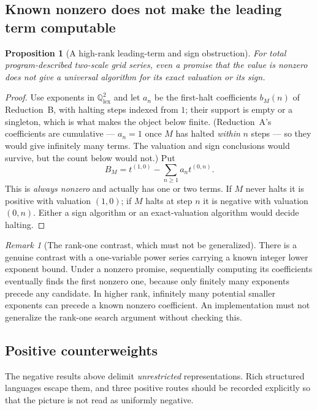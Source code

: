 \documentclass[11pt,letterpaper]{article}
\numberwithin{equation}{section}
\newtheorem{proposition}[theorem]{Proposition}
\theoremstyle{definition}
\theoremstyle{remark}
\newtheorem{remark}[theorem]{Remark}
\newcommand{\Q}{\mathbb Q}
\begin{document}
\subsection{Known nonzero does not make the leading term computable}
\label{cas:sub-highrank}
\begin{proposition}[A high-rank leading-term and sign obstruction]
\label{cas:prop-leading}
For total program-described two-scale grid series, even a promise that the value
is nonzero does not give a universal algorithm for its exact valuation or its
sign.
\end{proposition}
\begin{proof}
Use exponents in $\Q^2_{\mathrm{lex}}$ and let $a_n$ be the first-halt
coefficients $b_M(n)$ of Reduction~B, with halting steps indexed from $1$; their
support is empty or a singleton, which is what makes the object below finite.
(Reduction~A's coefficients are cumulative --- $a_n=1$ once $M$ has halted
\emph{within} $n$ steps --- so they would give infinitely many terms. The
valuation and sign conclusions would survive, but the count below would not.)
Put
\[
 B_M=t^{(1,0)}-\sum_{n\ge1}a_nt^{(0,n)} .
\]
This is \emph{always nonzero} and actually has one or two terms. If $M$ never
halts it is positive with valuation $(1,0)$; if $M$ halts at step $n$ it is
negative with valuation $(0,n)$. Either a sign algorithm or an exact-valuation
algorithm would decide halting.
\end{proof}

\begin{remark}[The rank-one contrast, which must not be generalized]
\label{cas:rem-rankone}
There is a genuine contrast with a one-variable power series carrying a known
integer lower exponent bound. Under a nonzero promise, sequentially computing
its coefficients eventually finds the first nonzero one, because only finitely
many exponents precede any candidate. In higher rank, infinitely many potential
smaller exponents can precede a known nonzero coefficient. An implementation
must not generalize the rank-one search argument without checking this.
\end{remark}

\subsection{Positive counterweights}
\label{cas:sub-positive}
The negative results above delimit \emph{unrestricted} representations. Rich
structured languages escape them, and three positive routes should be recorded
explicitly so that the picture is not read as uniformly negative.
\end{document}
